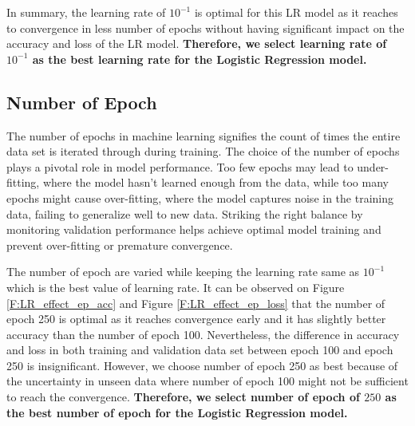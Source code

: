 \documentclass[12pt, a4paper, twoside]{article}
\begin{document}
\par
In summary, the learning rate of $10^{-1}$ is optimal for this LR model as it reaches to convergence in less number of epochs without having significant impact on the accuracy and loss of the LR model. \textbf{Therefore, we select learning rate of $10^{-1}$ as the best learning rate for the Logistic Regression model.}
\subsection{Number of Epoch}\label{SS:lr-ep}
The number of epochs in machine learning signifies the count of times the entire data set is iterated through during training. The choice of the number of epochs plays a pivotal role in model performance. Too few epochs may lead to under-fitting, where the model hasn't learned enough from the data, while too many epochs might cause over-fitting, where the model captures noise in the training data, failing to generalize well to new data. Striking the right balance by monitoring validation performance helps achieve optimal model training and prevent over-fitting or premature convergence.
\par
The number of epoch are varied while keeping the learning rate same as $10^{-1}$ which is the best value of learning rate. It can be observed on Figure \ref{F:LR_effect_ep_acc} and Figure \ref{F:LR_effect_ep_loss} that the number of epoch 250 is optimal as it reaches convergence early and it has slightly better accuracy than the number of epoch 100. Nevertheless, the difference in accuracy and loss in both training and validation data set between epoch 100 and epoch 250 is insignificant. However, we choose number of epoch 250 as best because of the uncertainty in unseen data where number of epoch 100 might not be sufficient to reach the convergence. \textbf{Therefore, we select number of epoch of $250$ as the best number of epoch for the Logistic Regression model.}
\end{document}
